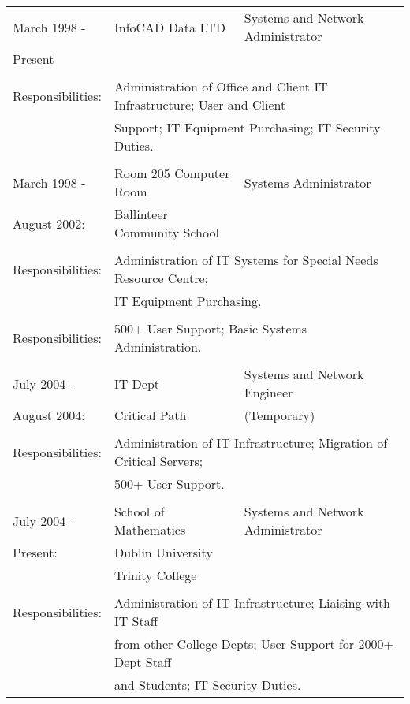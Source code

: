 \documentclass[a4paper, 11pt] {article}
\begin{document}
\begin{tabular}{llll}
March 1998 - 		&	InfoCAD Data LTD	& Systems and Network Administrator	&	\hspace{10mm}	\\
Present    			&			&              &            			\\
      				&			&              &            			\\
Responsibilities:	& \multicolumn{3}{l}{Administration of Office and Client IT Infrastructure; User and Client} 	\\
						& \multicolumn{3}{l}{Support; IT Equipment Purchasing; IT Security Duties.} 	\\
      				&              						&  &	\\
March 1998 -		& 	Room 205 Computer Room			&	Systems Administrator	& \hspace{10mm}	\\
August 2002:		&  Ballinteer Community School	&	&	\\
						& 		&	\\
Responsibilities:	& \multicolumn{3}{l}{Administration of IT Systems for Special Needs Resource Centre;} 	\\
						& \multicolumn{3}{l}{IT Equipment Purchasing.} 	\\
						& 											&	&	\\
Responsibilities:	& \multicolumn{3}{l}{500+ User Support; Basic Systems
Administration.} 	\\
						&											&	&	\\
July 2004 -			& IT Dept								&	Systems and Network Engineer	& \hspace{10mm}\\
August 2004:		& Critical Path						& (Temporary)	&	\\
						& 											&	&	\\
Responsibilities:	& \multicolumn{3}{l}{Administration of IT Infrastructure; Migration of Critical Servers;}	\\ 
						& \multicolumn{3}{l}{500+ User Support.} 	\\
						&												&\\
July 2004 -			& 	School of Mathematics	&	Systems and Network Administrator &	\\
Present:				& 	Dublin University			&	&	\\
						& 	Trinity College			&	&	\\
						& 									&	&	\\
Responsibilities:	& \multicolumn{3}{l}{Administration of IT Infrastructure; Liaising with IT Staff}	\\ 
						& \multicolumn{3}{l}{from other College Depts; User Support for 2000+ Dept Staff}	\\
						& \multicolumn{3}{l}{and Students; IT Security Duties.} 	\\
\end{tabular}
\end{document}
